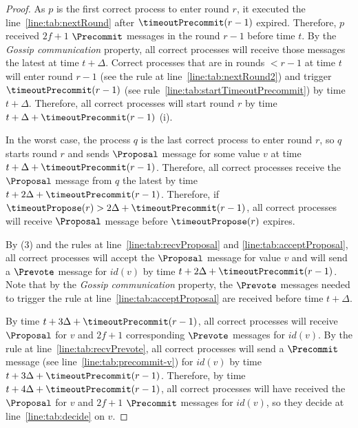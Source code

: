 \begin{proof} As $p$ is the first correct process to enter round $r$, it
    executed the line~\ref{line:tab:nextRound} after $\timeoutPrecommit(r-1)$
    expired. Therefore, $p$ received $2f+1$ $\Precommit$ messages in the round
    $r-1$ before time $t$. By the \emph{Gossip communication} property, all
    correct processes will receive those messages the latest at time $t +
    \Delta$. Correct processes that are in rounds $< r-1$ at time $t$ will
    enter round $r-1$ (see the rule at line~\ref{line:tab:nextRound2}) and
    trigger $\timeoutPrecommit(r-1)$ (see rule~\ref{line:tab:startTimeoutPrecommit})
    by time $t+\Delta$. Therefore, all correct processes will start round $r$
    by time $t+\Delta+\timeoutPrecommit(r-1)$ (i).
 
In the worst case, the process $q$ is the last correct process to enter round
$r$, so $q$ starts round $r$ and sends $\Proposal$ message for some value $v$
at time $t + \Delta + \timeoutPrecommit(r-1)$. Therefore, all correct processes
receive the $\Proposal$ message from $q$ the latest by time $t + 2\Delta +
\timeoutPrecommit(r-1)$. Therefore, if $\timeoutPropose(r) > 2\Delta +
\timeoutPrecommit(r-1)$, all correct processes will receive $\Proposal$ message
before $\timeoutPropose(r)$ expires. 

By (3) and the rules at line~\ref{line:tab:recvProposal} and
\ref{line:tab:acceptProposal}, all correct processes will accept the
$\Proposal$ message for value $v$ and will send a $\Prevote$ message for
$id(v)$ by time $t + 2\Delta + \timeoutPrecommit(r-1)$.  Note that by the
\emph{Gossip communication} property, the $\Prevote$ messages needed to trigger
the rule at line~\ref{line:tab:acceptProposal} are received before time $t +
\Delta$.  

By time $t + 3\Delta + \timeoutPrecommit(r-1)$, all correct processes will receive
$\Proposal$ for $v$ and $2f+1$ corresponding $\Prevote$ messages for $id(v)$.
By the rule at line~\ref{line:tab:recvPrevote}, all correct processes will send
a $\Precommit$ message (see line~\ref{line:tab:precommit-v}) for $id(v)$ by
time $t + 3\Delta + \timeoutPrecommit(r-1)$. Therefore, by time $t + 4\Delta +
\timeoutPrecommit(r-1)$, all correct processes will have received the $\Proposal$
for $v$ and $2f+1$ $\Precommit$ messages for $id(v)$, so they decide at
line~\ref{line:tab:decide} on $v$. 


\end{proof}

